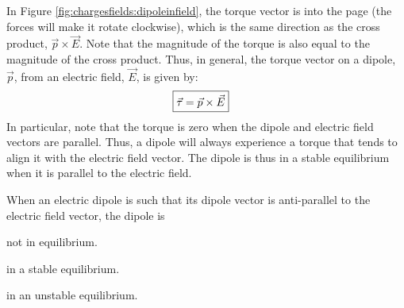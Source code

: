 In Figure \ref{fig:chargesfields:dipoleinfield}, the torque vector is into the page (the forces will make it rotate clockwise), which is the same direction as the cross product, $\vec p \times \vec E$. Note that the magnitude of the torque is also equal to the magnitude of the cross product. Thus, in general, the torque vector on a dipole, $\vec p$, from an electric field, $\vec E$, is given by:
\begin{align*}
\Aboxed{\vec \tau =\vec p \times \vec E}
\end{align*}
In particular, note that the torque is zero when the dipole and electric field vectors are parallel. Thus, a dipole will always experience a torque that tends to align it with the electric field vector. The dipole is thus in a stable equilibrium when it is parallel to the electric field.
\begin{checkpoint}\label{cp:chargesfields:efield}
\begin{MCquestion}{When an electric dipole is such that its dipole vector is anti-parallel to the electric field vector, the dipole is}
\item not in equilibrium.
\item in a stable equilibrium.
\item in an unstable equilibrium. \correct
\end{MCquestion}
\end{checkpoint}

